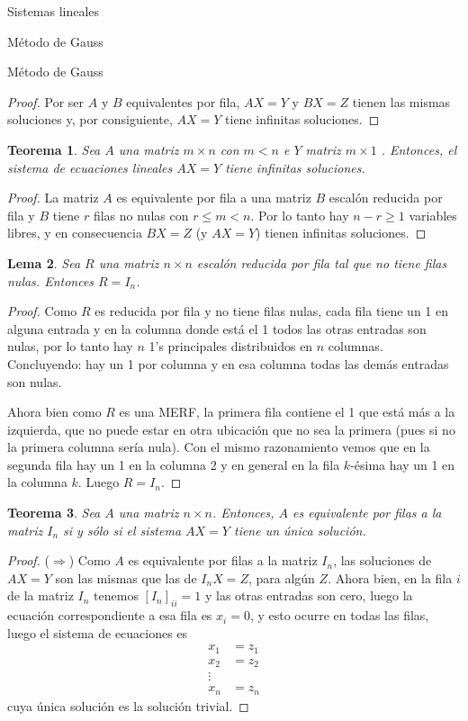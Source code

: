 \documentclass[a4paper,12pt,twoside,spanish]{amsbook}
\newtheorem{teorema}{Teorema}[section]
\newtheorem{lema}[teorema]{Lema}
\theoremstyle{definition}
\theoremstyle{remark}
\begin{document}
\begin{chapter}{Sistemas lineales}
\begin{section}{Método de Gauss }
\begin{subsection}{Método de Gauss}
\begin{proof}
					Por ser $A$ y $B$ equivalentes por fila, $AX=Y$ y $BX=Z$ tienen las mismas soluciones y, por consiguiente, $AX=Y$ tiene infinitas soluciones. 
				\end{proof}
				
				\begin{teorema}\label{soluciones-m-menor-n}
					Sea $A$ una matriz $m \times n$ con  $m < n$ e $Y$ matriz $m \times 1$ . Entonces, el sistema de ecuaciones lineales $AX=Y$ tiene infinitas soluciones.
				\end{teorema}
				\begin{proof}
					La matriz $A$ es equivalente por fila a una matriz $B$ escalón reducida por fila 
					y $B$ tiene $r$ filas no nulas con $r \le m <n$. Por lo tanto hay $n-r \ge 1$ variables libres, y en consecuencia $BX=Z$ (y $AX=Y$) tienen infinitas soluciones.
				\end{proof}
				
				\begin{lema}\label{mtrx-merf-id}
					Sea $R$ una matriz $n \times n$ escalón reducida por fila tal que no tiene filas nulas. Entonces $R=I_n$. 
				\end{lema}
				\begin{proof}
					Como  $R$ es reducida por fila y no tiene filas nulas, cada fila tiene  un 1 en alguna entrada y en la columna donde está el 1 todos las otras entradas son nulas, por  lo tanto hay $n$ 1's principales distribuidos en $n$ columnas. Concluyendo: hay un 1 por columna y en esa columna todas las demás entradas son nulas. 
					
					Ahora bien como $R$ es una MERF, la primera fila contiene el 1 que está más a la izquierda, que no puede estar en otra ubicación que no sea la primera (pues si no la primera columna sería nula). Con el mismo razonamiento vemos que en la segunda fila hay un 1 en la columna 2 y en general en la fila $k$-ésima hay un 1 en la columna $k$. Luego $R=I_n$.
				\end{proof}			
				
				\begin{teorema}
					Sea $A$ una matriz $n \times n$. Entonces, $A$ es equivalente por filas a la matriz $I_n$  si y sólo si el sistema $AX = Y$ tiene un única solución. 
				\end{teorema}
				\begin{proof}
					($\Rightarrow$) Como $A$ es equivalente por filas a la matriz $I_n$, las soluciones de $AX =Y$ son las mismas que las de $I_nX=Z$, para algún $Z$. Ahora bien,  en la fila $i$ de la matriz $I_n$ tenemos $[I_n]_{ii} =1$ y las otras entradas son cero, luego la ecuación correspondiente a esa fila es $x _i =0$, y esto ocurre en todas las filas, luego el sistema de ecuaciones es
					\begin{align*}
					x_1 &=z_1 \\ x_2 &= z_2 \\ \vdots \\ x_n &= z_n
					\end{align*}
					cuya única solución es la solución trivial.
					

\end{proof}
\end{subsection}
\end{section}
\end{chapter}
\end{document}

